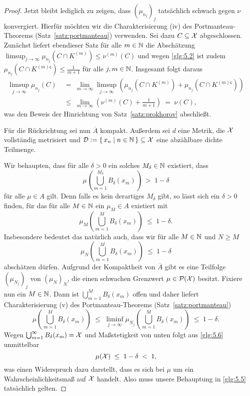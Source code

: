 \documentclass[../main/main.tex]{subfiles}
\begin{document}
\begin{proof}
		Jetzt bleibt lediglich zu zeigen, dass $(\mu_{n_j})_j$ tatsächlich schwach gegen $\nu$ konvergiert. 
		Hierfür möchten wir die Charakterisierung (iv) des Portmanteau-Theorems (Satz~\ref{satz:portmanteau}) verwenden.
		Sei dazu $C \subseteq \mathcal{X}$ abgeschlossen. Zunächst liefert ebendieser Satz für alle $m \in \mathbb{N}$ die 
		Abschätzung $\limsup_{j \to \infty} \mu_{n_j}(C \cap K^{(m)}) \leq \nu^{(m)}(C)$ und wegen \eqref{glg:5.2} ist 
		zudem $\mu_{n_j}(C \cap K^{(m) \mathsf{c}}) \leq  \frac{1}{m+1}$ für alle $j, m \in \mathbb{N}$. Insgesamt folgt daraus 
		\begin{align*}
			\limsup_{j \to \infty} \mu_{n_j}(C) \; &=    \; \lim_{m \to \infty} \limsup_{j \to \infty} 
			\left( \mu_{n_j}(C \cap K^{(m)}) + \mu_{n_j}(C \cap K^{(m) \mathsf{c}}) \right) \\
			&\leq \; \lim_{m \to \infty} \left( \nu^{(m)}(C) + \frac{1}{m+1} \right) 
			\; = \; \nu(C) \text{,}
		\end{align*}
		was den Beweis der Hinrichtung von Satz~\ref{satz:prokhorov} abschließt.
		
		Für die Rückrichtung sei nun $\overline{A}$ kompakt. Außerdem sei $d$ eine Metrik, die $\mathcal{X}$ vollständig metrisiert 
		und $\mathcal{D} \vcentcolon = \left\{\, x_n \; \middle| \; n \in \mathbb{N} \,\right\} \subseteq \mathcal{X}$ eine abzählbare dichte Teilmenge.
		
		Wir behaupten, dass für alle $\delta > 0$ ein solches $M_\delta \in \mathbb{N}$ existiert, dass
		\[ \mu(\bigcup_{m=1}^{M_\delta} B_\delta(x_m)) \; > \; 1 - \delta \label{glg:5.5} \tag{5.5} \]
		für alle $\mu \in A$ gilt. Denn falls es kein derartiges $M_\delta$ gibt, so lässt sich ein $\delta > 0$ finden, für das
		für alle $M \in \mathbb{N}$ ein $\mu_M \in A$ existiert mit
		\[ \mu_M(\bigcup_{m=1}^{M} B_\delta(x_m)) \; \leq \; 1 - \delta \text{.} \]
		Insbesondere bedeutet das natürlich auch, dass wir für alle $M \in \mathbb{N}$ und $N \geq M$ 
		\[ \mu_N(\bigcup_{m=1}^{M} B_\delta(x_m)) \; \leq \; 1 - \delta \]
		abschätzen dürfen. Aufgrund der Kompaktheit von $\overline{A}$ gibt es eine Teilfolge $(\mu_{N_j})_j$ von $(\mu_N)_N$, 
		die einen schwachen Grenzwert $\mu \in \mathcal{P}(\mathcal{X})$ besitzt. Fixiere nun ein $M \in \mathbb{N}$. 
		Dann ist $\bigcup_{m=1}^{M} B_\delta(x_m)$
		offen und daher liefert Charakterisierung (v) des Portmanteau-Theorems (Satz~\ref{satz:portmanteau})
		\[ \mu(\bigcup_{m=1}^{M} B_\delta(x_m)) 
		\; \leq \; \liminf_{j \to \infty} \mu_{N_j}(\bigcup_{m=1}^{M} B_\delta(x_m)) 
		\; \leq \; 1 - \delta \text{.} \label{glg:5.6} \tag{5.6} \]
		Wegen $\bigcup_{m=1}^{\infty} B_\delta(x_m) = \mathcal{X}$ und Maßstetigkeit von unten 
		folgt aus \eqref{glg:5.6} unmittelbar 
		\[ \mu(\mathcal{X}) \; \leq \; 1 - \delta \; < \; 1 \text{,} \]
		was einen Widerspruch dazu darstellt, dass es sich bei $\mu$ um ein 
		Wahrscheinlichkeitsmaß auf $\mathcal{X}$ handelt. Also muss unsere Behauptung in \eqref{glg:5.5} tatsächlich gelten.
		

\end{proof}
\end{document}

